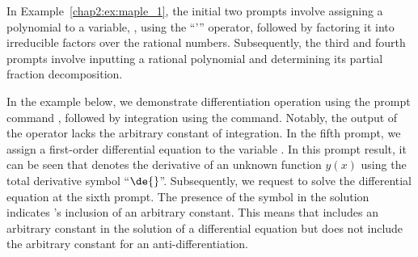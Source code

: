 %
In Example~\ref{chap2:ex:maple_1}, the initial two prompts involve assigning a polynomial to a variable, , using the ``'\code{:=}'' operator, followed by factoring it into irreducible factors over the rational numbers. Subsequently, the third and fourth prompts involve inputting a rational polynomial and determining its partial fraction decomposition.

In the example below, we demonstrate differentiation operation using the prompt command , followed by integration using the  command. Notably, the output of the  operator lacks the arbitrary constant of integration. In the fifth prompt, we assign a first-order differential equation to the variable . In this prompt result, it can be seen that \Maple{} denotes the derivative of an unknown function $y(x)$ using the total derivative symbol ``$\de{}$''. Subsequently, we request \Maple{} to solve the differential equation at the sixth prompt. The presence of the symbol  in the solution indicates \Maple{}'s inclusion of an arbitrary constant. This means that \Maple{} includes an arbitrary constant in the solution of a differential equation but does not include the arbitrary constant for an anti-differentiation.
%
